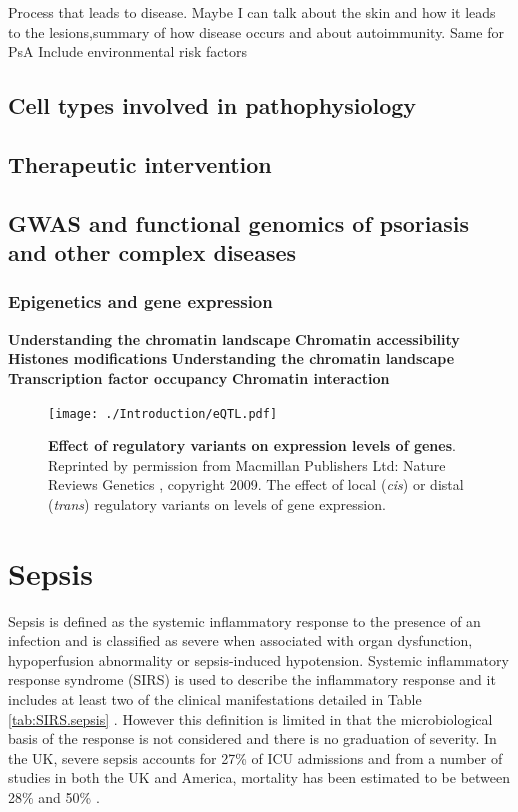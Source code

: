 Process that leads to disease. Maybe I can talk about the skin and how it leads to the lesions,summary of how disease occurs and about autoimmunity. Same for PsA
Include environmental risk factors







%
\subsection*{Cell types involved in pathophysiology}

\subsection*{Therapeutic intervention}
%


\subsection*{GWAS and functional genomics of psoriasis and other complex diseases}
\subsubsection*{Epigenetics and gene expression}
\textbf{Understanding the chromatin landscape}
\textbf{Chromatin accessibility}
\textbf{Histones modifications}
\textbf{Understanding the chromatin landscape}
\textbf{Transcription factor occupancy}
\textbf{Chromatin interaction}

\begin{figure}[H]
\texttt{[image: ./Introduction/eQTL.pdf]}%
\caption[Effect of regulatory variants on expression levels of genes]{\textbf{Effect of regulatory variants on expression levels of genes}. Reprinted by permission from Macmillan Publishers Ltd: Nature Reviews Genetics \parencite{Cheung2009}, copyright 2009. The effect of local (\textit{cis}) or distal (\textit{trans}) regulatory variants on levels of gene expression.}%
\label{fig:intro.eQTL}%
\end{figure}


\section{Sepsis}
Sepsis is defined as the systemic inflammatory response to the presence of an infection and is classified as severe when associated with organ dysfunction, hypoperfusion abnormality or sepsis-induced hypotension.  Systemic inflammatory response syndrome (SIRS) is used to describe the inflammatory response and it includes at least two of the clinical manifestations detailed in Table \ref{tab:SIRS.sepsis} \parencite{Bone1992}.  However this definition is limited in that the microbiological basis of the response is not considered and there is no graduation of severity.  In the UK, severe sepsis accounts for 27\% of ICU admissions \parencite{Padkin2003} and from a number of studies in both the UK and America, mortality has been estimated to be between 28\% and 50\% \parencite{Angus2001, Padkin2003, Sands1997, Zeni1997}. \\

